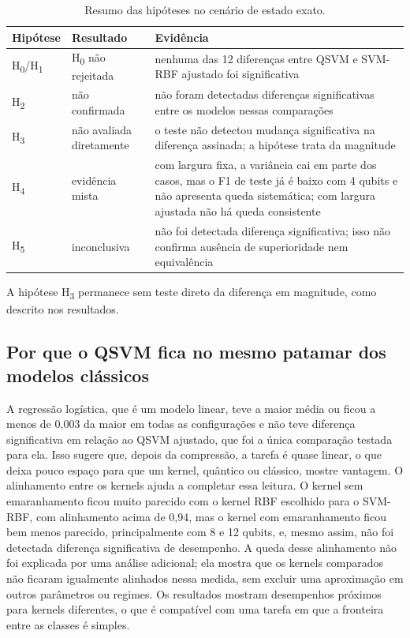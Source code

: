 \documentclass[conference]{IEEEtran}
\newcommand{\svm}{\mbox{SVM-RBF}}
\begin{document}
\begin{table}[t]
\centering
\caption{Resumo das hipóteses no cenário de estado exato.}
\label{tab:hipoteses}
\footnotesize
\setlength{\tabcolsep}{3pt}
\begin{tabular}{>{\raggedright\arraybackslash}p{}>{\raggedright\arraybackslash}p{}>{\raggedright\arraybackslash}p{}}
\toprule
Hipótese & Resultado & Evidência \\
\midrule
H\textsubscript{0}/H\textsubscript{1} & H\textsubscript{0} não rejeitada & nenhuma das 12 diferenças entre QSVM e \svm{} ajustado foi significativa \\
H\textsubscript{2} & não confirmada & não foram detectadas diferenças significativas entre os modelos nessas comparações \\
H\textsubscript{3} & não avaliada diretamente & o teste não detectou mudança significativa na diferença assinada; a hipótese trata da magnitude \\
H\textsubscript{4} & evidência mista & com largura fixa, a variância cai em parte dos casos, mas o F1 de teste já é baixo com 4 qubits e não apresenta queda sistemática; com largura ajustada não há queda consistente \\
H\textsubscript{5} & inconclusiva & não foi detectada diferença significativa; isso não confirma ausência de superioridade nem equivalência \\
\bottomrule
\end{tabular}
\end{table}

A hipótese H\textsubscript{3} permanece sem teste direto da diferença em magnitude, como descrito nos resultados.

\subsection{Por que o QSVM fica no mesmo patamar dos modelos clássicos}
A regressão logística, que é um modelo linear, teve a maior média ou ficou a menos de 0,003 da maior em todas as configurações e não teve diferença significativa em relação ao QSVM ajustado, que foi a única comparação testada para ela. Isso sugere que, depois da compressão, a tarefa é quase linear, o que deixa pouco espaço para que um kernel, quântico ou clássico, mostre vantagem. O alinhamento entre os kernels ajuda a completar essa leitura. O kernel sem emaranhamento ficou muito parecido com o kernel RBF escolhido para o \svm{}, com alinhamento acima de 0,94, mas o kernel com emaranhamento ficou bem menos parecido, principalmente com 8 e 12 qubits, e, mesmo assim, não foi detectada diferença significativa de desempenho. A queda desse alinhamento não foi explicada por uma análise adicional; ela mostra que os kernels comparados não ficaram igualmente alinhados nessa medida, sem excluir uma aproximação em outros parâmetros ou regimes. Os resultados mostram desempenhos próximos para kernels diferentes, o que é compatível com uma tarefa em que a fronteira entre as classes é simples.
\end{document}

